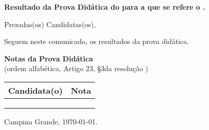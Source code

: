 \documentclass[12pt]{uaefata}
\date{} %
\begin{document}
\begin{letter}{
		\textbf{Resultado da Prova Didática do \concurso para \cargo  a que se refere o \edital.}
	}
 
\opening{Prezadas(os) Candidatas(os),}

Seguem neste comunicado, os resultados da prova didática.


\centering

\textbf{Notas da Prova Didática} \\
(ordem alfabética, Artigo 23, \S 3\textordmasculine da resolução \resconc)


\begin{tabular}{|l|c|}
	\hline
	\textbf{Candidata(o)} & \textbf{Nota} \\
	\hline
	\cdta	&	\cdtand	\\
	\cdtb	&	\cdtbnd	\\
	\cdtc	&	\cdtcnd	\\
	\hline
\end{tabular} 




\closing{Campina Grande, \today.}




\end{letter}
\end{document}
